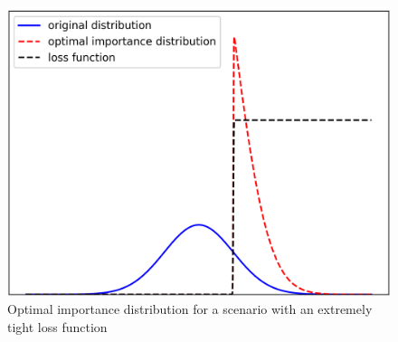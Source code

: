     \begin{figure}[H]
        \centering
        \includegraphics[scale=0.50]{Manuscript/Figures/Images/Methods/optimal_IS_dist_case5.png}
        \caption{Optimal importance distribution for a scenario with an extremely tight loss function}
        \label{fig:optimal_IS_dist_case5}
    \end{figure}